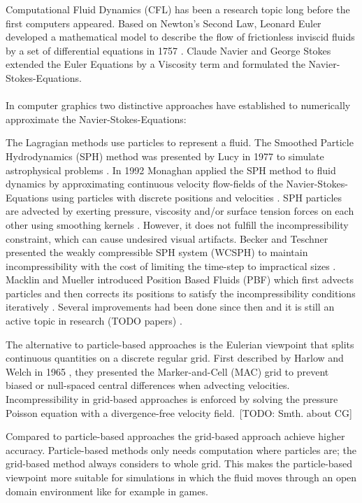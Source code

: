 Computational Fluid Dynamics (CFL) has been a research topic long before the first computers appeared. Based on Newton's Second Law, Leonard Euler developed a mathematical model to describe the flow of frictionless inviscid fluids by a set of differential equations in 1757 \parencite{euler1757principes}. Claude Navier and George Stokes extended the Euler Equations by a Viscosity term and formulated the Navier-Stokes-Equations. \\\\
In computer graphics two distinctive approaches have established to numerically approximate the Navier-Stokes-Equations: 
\par The Lagragian methods use particles to represent a fluid. The Smoothed Particle Hydrodynamics (SPH) method was presented by Lucy in 1977 to simulate astrophysical problems \parencite{lucy1977numerical}. In 1992 Monaghan applied the SPH method to fluid dynamics by approximating continuous velocity flow-fields of the Navier-Stokes-Equations using particles with discrete positions and velocities \parencite{monaghan1992smoothed}. SPH particles are advected by exerting pressure, viscosity and/or surface tension forces on each other using smoothing kernels \parencite{muller2003particle}. However, it does not fulfill the incompressibility constraint, which can cause undesired visual artifacts. Becker and Teschner presented the weakly compressible SPH system (WCSPH) to maintain incompressibility with the cost of limiting the time-step to impractical sizes \parencite{becker2007weakly}. Macklin and Mueller introduced Position Based Fluids (PBF) which first advects particles and then corrects its positions to satisfy the incompressibility conditions iteratively \parencite{macklin2013position}. Several improvements had been done since then and it is still an active topic in research (TODO papers) \parencite{morikawaimprovements}.
\par The alternative to particle-based approaches is the Eulerian viewpoint that splits continuous quantities on a discrete regular grid. First described by Harlow and Welch in 1965 \parencite{harlow1965numerical}, they presented the Marker-and-Cell (MAC) grid to prevent biased or null-spaced central differences when advecting velocities. Incompressibility in grid-based approaches is enforced by solving the pressure Poisson equation with a divergence-free velocity field. [TODO: Smth. about CG]
\par Compared to particle-based approaches the grid-based approach achieve higher accuracy. Particle-based methods only needs computation where particles are; the grid-based method always considers to whole grid. This makes the particle-based viewpoint more suitable for simulations in which the fluid moves through an open domain environment like for example in games. 
